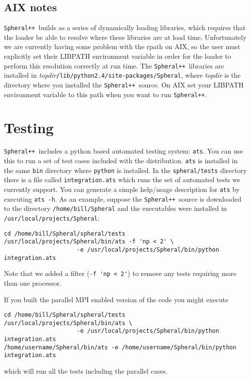 \documentclass{article}
\newcommand{\Spheral}{{\tt Spheral++}}
\begin{document}
\subsection{AIX notes}
\Spheral\ builds as a series of dynamically loading libraries, which requires that the loader be able to resolve where these libraries are at load time.  Unfortunately we are currently having some problem with the rpath on AIX, so the user must explicitly set their LIBPATH environment variable in order for the loader to perform this resolution correctly at run time.  The \Spheral\ libraries are installed in {\em topdir}{\tt /lib/python2.4/site-packages/Spheral}, where {\em topdir} is the directory where you installed the \Spheral\ source.  On AIX set your LIBPATH environment variable to this path when you want to run \Spheral.

\section{Testing}
\Spheral\ includes a python based automated testing system: \verb+ats+.  You can use this to run a set of test cases included with the distribution.  \verb+ats+ is installed in the same \verb+bin+ directory where \verb+python+ is installed.  In the \verb+spheral/tests+ directory there is a file called \verb+integration.ats+ which runs the set of automated tests we currently support.  You can generate a simple help/usage description for {\tt ats} by executing \verb+ats -h+.  As an example, suppose the \Spheral\ source is downloaded to the directory \verb./home/bill/Spheral. and the executables were installed in \verb./usr/local/projects/Spheral.:
\begin{verbatim}
cd /home/bill/Spheral/spheral/tests
/usr/local/projects/Spheral/bin/ats -f 'np < 2' \
                     -e /usr/local/projects/Spheral/bin/python integration.ats
\end{verbatim}
Note that we added a filter (\verb+-f 'np < 2'+) to remove any tests requiring more than one processor.

If you built the parallel MPI enabled version of the code you might execute
\begin{verbatim}
cd /home/bill/Spheral/spheral/tests
/usr/local/projects/Spheral/bin/ats \
                     -e /usr/local/projects/Spheral/bin/python integration.ats
/home/username/Spheral/bin/ats -e /home/username/Spheral/bin/python integration.ats
\end{verbatim}
which will run all the tests including the parallel cases.
\end{document}
